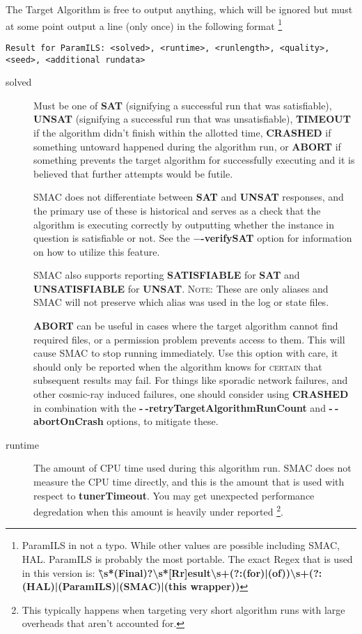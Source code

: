 \documentclass[manual.tex]{subfiles}
\begin{document}
The Target Algorithm is free to output anything, which will be ignored
but must at some point output a line (only once) in the following
format%
\footnote{ParamILS in not a typo. While other values are possible including
SMAC, HAL. ParamILS is probably the most portable. The exact Regex
that is used in this version is: \textbf{\^\textbackslash{}s{*}(Final)?\textbackslash{}s{*}{[}Rr{]}esult\textbackslash{}s+(?:(for)|(of))\textbackslash{}s+(?:(HAL)|(ParamILS)|(SMAC)|(this
wrapper))}} %


\texttt{Result for ParamILS: <solved>, <runtime>, <runlength>, <quality>, <seed>, <additional rundata>}
\begin{description}

\item [{solved}] Must be one of \textbf{SAT} (signifying a successful run that was satisfiable), \textbf{UNSAT} (signifying a successful run that was unsatisfiable), \textbf{TIMEOUT} if the algorithm didn't finish within the allotted time, \textbf{CRASHED} if something untoward happened during the algorithm run, or \textbf{ABORT} if something prevents the target algorithm for successfully executing and it is believed that further attempts would be futile. 

SMAC does not differentiate between \textbf{SAT} and \textbf{UNSAT} responses, and the primary use of these is historical and serves as a check that the algorithm is executing correctly by outputting whether the instance in question is satisfiable or not. See the \textbf{$-\!\!$-verifySAT} option for information on how to utilize this feature.

SMAC also supports reporting \textbf{SATISFIABLE} for \textbf{SAT} and \textbf{UNSATISFIABLE} for \textbf{UNSAT}. \textsc{Note:} These are only aliases and SMAC will not preserve which alias was used in the log or state files.


\textbf{ABORT} can be useful in
cases where the target algorithm cannot find required files, or a
permission problem prevents access to them. This will cause SMAC to
stop running immediately. Use this option with care, it should only be reported when the algorithm knows for \textsc{certain} that subsequent results may fail. For things like sporadic network failures, and other cosmic-ray induced failures, one should consider using \textbf{CRASHED} in combination with the \textbf{-$\!~$-retryTargetAlgorithmRunCount}  and \textbf{-$~\!\!$-abortOnCrash} options, to mitigate these.

\item [{runtime}] The amount of CPU time used during this algorithm run.
SMAC does not measure the CPU time directly, and this is the amount
that is used with respect to \textbf{tunerTimeout}. You may get
unexpected performance degredation when this amount is heavily under
reported \footnote{This typically happens when targeting very short algorithm
runs with large overheads that aren't accounted for.}. \\


\end{description}
\end{document}
